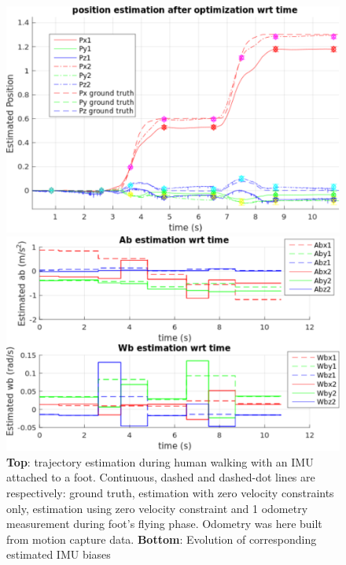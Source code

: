 \begin{figure}[tb]
\centering
\includegraphics[scale=0.47]{figures/Result_position}
\par\vspace{4mm}
\includegraphics[scale=0.47]{figures/Result_bias}
\caption{ 
{\bf Top}: trajectory estimation during human walking with an IMU attached to a foot. Continuous, dashed and dashed-dot lines are respectively: ground truth, 
estimation with zero velocity constraints only, estimation using zero velocity constraint and 1 odometry measurement during foot's flying phase. Odometry was here built from motion capture data.
{\bf Bottom}: Evolution of corresponding estimated IMU biases 
}
\label{fig:forward_walk_IRI}
\end{figure}

